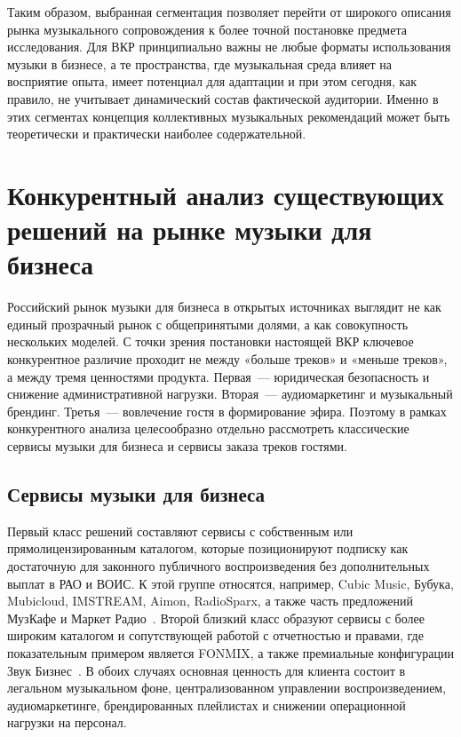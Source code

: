 Таким образом, выбранная сегментация позволяет перейти от широкого описания рынка музыкального сопровождения к более точной постановке предмета исследования. Для ВКР принципиально важны не любые форматы использования музыки в бизнесе, а те пространства, где музыкальная среда влияет на восприятие опыта, имеет потенциал для адаптации и при этом сегодня, как правило, не учитывает динамический состав фактической аудитории. Именно в этих сегментах концепция коллективных музыкальных рекомендаций может быть теоретически и практически наиболее содержательной.

\section{Конкурентный анализ существующих решений на рынке музыки для бизнеса}
\label{sec:market:competitors}

Российский рынок музыки для бизнеса в открытых источниках выглядит не как единый прозрачный рынок с общепринятыми долями, а как совокупность нескольких моделей. С точки зрения постановки настоящей ВКР ключевое конкурентное различие проходит не между «больше треков» и «меньше треков», а между тремя ценностями продукта. Первая~--- юридическая безопасность и снижение административной нагрузки. Вторая~--- аудиомаркетинг и музыкальный брендинг. Третья~--- вовлечение гостя в формирование эфира. Поэтому в рамках конкурентного анализа целесообразно отдельно рассмотреть классические сервисы музыки для бизнеса и сервисы заказа треков гостями.

\subsection{Сервисы музыки для бизнеса}

Первый класс решений составляют сервисы с собственным или прямолицензированным каталогом, которые позиционируют подписку как достаточную для законного публичного воспроизведения без дополнительных выплат в РАО и ВОИС. К этой группе относятся, например, Cubic Music, Бубука, Mubicloud, IMSTREAM, Aimon, RadioSparx, а также часть предложений МузКафе и Маркет Радио~\cite{cubic_music_site,bubuka_site,mubicloud_site,imstream_site,aimon_site,radiosparx_site,muscafe_site,market_radio_site}. Второй близкий класс образуют сервисы с более широким каталогом и сопутствующей работой с отчетностью и правами, где показательным примером является FONMIX, а также премиальные конфигурации Звук Бизнес~\cite{fonmix_site,zvuk_business_site}. В обоих случаях основная ценность для клиента состоит в легальном музыкальном фоне, централизованном управлении воспроизведением, аудиомаркетинге, брендированных плейлистах и снижении операционной нагрузки на персонал.

